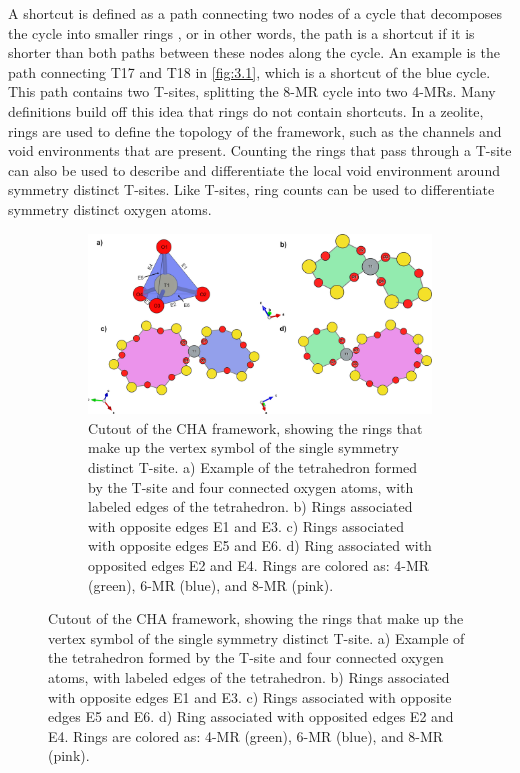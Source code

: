 \documentclass[11pt]{article}
\begin{document}
A shortcut is defined as a path connecting two nodes of a cycle that decomposes the cycle into smaller rings \cite{guttman-ring-1990,goetzke-properties-1991}, or in other words, the path is a shortcut if it is shorter than both paths between these nodes along the cycle. An example is the path connecting T17 and T18 in \cref{fig:3.1}, which is a shortcut of the blue cycle. This path contains two T-sites, splitting the 8-MR cycle into two 4-MRs. Many definitions build off this idea that rings do not contain shortcuts. In a zeolite, rings are used to define the topology of the framework, such as the channels and void environments that are present. Counting the rings that pass through a T-site can also be used to describe and differentiate the local void environment around symmetry distinct T-sites. Like T-sites, ring counts can be used to differentiate symmetry distinct oxygen atoms.

\begin{figure}
\begin{figure}[H]
\centering
\includegraphics[width=\textwidth]{figures/chapter-3/cha-vertex.pdf}
\caption{Cutout of the CHA framework, showing the rings that make up the vertex symbol of the single symmetry distinct T-site. a) Example of the tetrahedron formed by the T-site and four connected oxygen atoms, with labeled edges of the tetrahedron. b) Rings associated with opposite edges E1 and E3. c) Rings associated with opposite edges E5 and E6. d) Ring associated with opposited edges E2 and E4. Rings are colored as: 4-MR (green), 6-MR (blue), and 8-MR (pink). \label{fig:cha-vertex}}
\end{figure}
\end{figure}
\end{document}
